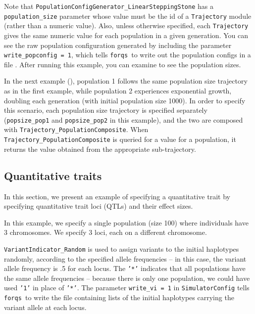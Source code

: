 \documentclass{article}
\newcommand{\forqs}[0]{\texttt{forqs }}
\newcommand{\codeinput}[1]{\begin{small}  \end{small}}
\begin{document}
\codeinput{../examples/tutorial_4a_trajectories.txt}

\begin{sloppypar}
Note that \texttt{PopulationConfigGenerator\_LinearSteppingStone} has a
\texttt{population\_size} parameter whose value must be the id of a
\texttt{Trajectory} module (rather than a numeric value).  Also,
unless otherwise specified, each \texttt{Trajectory} gives the same numeric
value for each population in a given generation.  You can see the raw
population configuration generated by including the parameter
\texttt{write\_popconfig = 1}, which tells \forqs to write out the population
configs in a file .  After running this example, you
can examine  to see the population sizes.
\end{sloppypar}

In the next example (), population 1 follows
the same population size trajectory as in the first example, while population 2
experiences exponential growth, doubling each generation (with initial
population size 1000).  In order to specify this scenario, each population size
trajectory is specified separately (\texttt{popsize\_pop1} and
\texttt{popsize\_pop2} in this example), and the two are composed with
\texttt{Trajectory\_PopulationComposite}.  When
\texttt{Trajectory\_PopulationComposite} is queried for a value for a
population, it returns the value obtained from the appropriate sub-trajectory.

\codeinput{../examples/tutorial_4b_trajectories.txt}


\subsection{Quantitative traits}

In this section, we present an example of specifying a quantitative trait
by specifying quantitative trait loci (QTLs) and their effect sizes.

\codeinput{../examples/tutorial_5_qtl.txt}

In this example, we specify a single population (size 100) where individuals
have 3 chromosomes.  We specify 3 loci, each on a different chromosome.

\texttt{VariantIndicator\_Random} is used to assign variants to the initial haplotypes 
randomly, according to the specified allele frequencies -- in this case, the
variant allele frequency is .5 for each locus.  The \texttt{'*'} indicates
that all populations have the same allele frequencies -- because there is only one
population, we could have used \texttt{'1'} in place of \texttt{'*'}.  The
parameter \texttt{write\_vi = 1} in \texttt{SimulatorConfig} tells \forqs to
write the file  containing lists of the initial haplotypes carrying
the variant allele at each locus.
\end{document}
